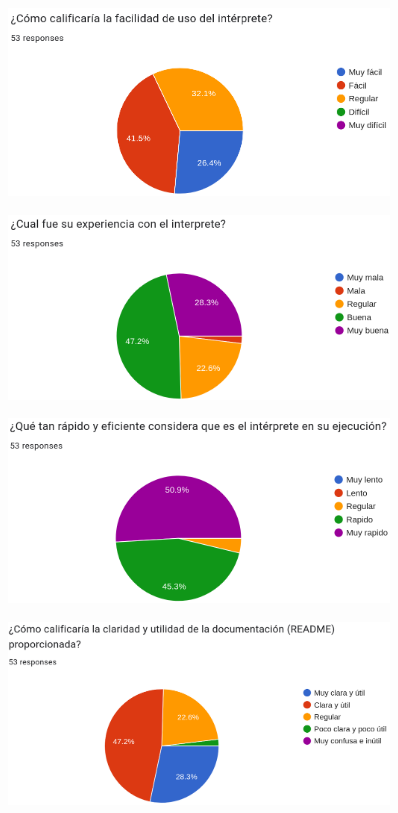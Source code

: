 \begin{figure}[!h]
  \includegraphics*[width=0.9\textwidth]{images/ap04.png}
\end{figure}
\begin{figure}[!h]
  \includegraphics*[width=0.9\textwidth]{images/ap05.png}
\end{figure}
\begin{figure}[!h]
  \includegraphics*[width=0.9\textwidth]{images/ap06.png}
\end{figure}
\begin{figure}[!h]
  \includegraphics*[width=0.9\textwidth]{images/ap07.png}
\end{figure}

